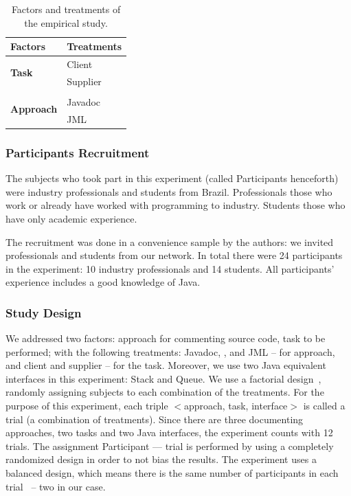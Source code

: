 \begin{table}[ht]
\caption{Factors and treatments of the empirical study.}
\label{tab:factorsEmpStudy}
\centering
\begin{tabular}{ll} \toprule
\bfseries Factors & \bfseries Treatments \\
\hline

\multirow{2}{*}{\textbf{Task}} & Client \\
& Supplier \\ \hline 

\multirow{3}{*}{\textbf{Approach}} & \contractjdoc{} \\
 & Javadoc \\
& JML \\ \bottomrule
\end{tabular}
\end{table}

\subsubsection{Participants Recruitment}
\label{sec:expPart}

The subjects who took part in this experiment (called Participants
henceforth) were industry professionals and students from Brazil. Professionals
those who work or already have worked with programming to industry. Students those who have only academic
experience.

The recruitment was done in a convenience sample by the authors: we invited
professionals and students from our network. In total there were 24 participants
in the experiment: 10 industry professionals and 14 students. All participants'
experience includes a good knowledge of Java.


\subsubsection{Study Design}
\label{sec:studyDesign}

We addressed two factors: approach for commenting
source code, task to be performed; with the following treatments: Javadoc, \contractjdoc{}, and JML
-- for approach, and client and supplier -- for the task.
Moreover, we use two Java equivalent interfaces in this experiment: Stack and Queue.
We use a factorial design~\cite{wohlin},  randomly assigning subjects to each combination of the
treatments. For the purpose of this experiment, each triple
$<$approach, task, interface$>$ is called a trial (a combination of treatments).
Since there are three documenting approaches, two tasks and two Java interfaces,
the experiment counts with 12 trials. The assignment Participant --- trial is performed by using a
completely randomized design in order to not bias the results.
% 
The experiment uses a balanced design, which means there is the same number of
participants in each trial~\cite{wohlin} -- two in our case.


